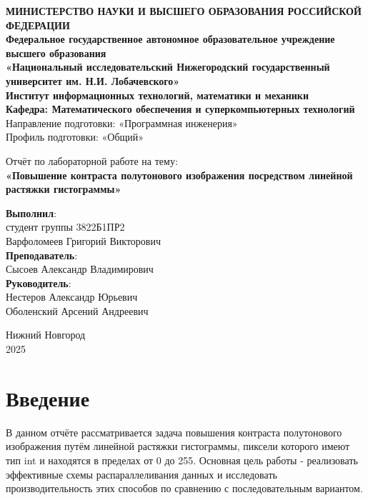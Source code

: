 \documentclass[a4paper,12pt]{article}
\begin{document}
\begin{titlepage}
\begin{center}
\textbf{МИНИСТЕРСТВО НАУКИ И ВЫСШЕГО ОБРАЗОВАНИЯ РОССИЙСКОЙ ФЕДЕРАЦИИ} \\
\textbf{Федеральное государственное автономное образовательное учреждение высшего образования} \\
\textbf{«Национальный исследовательский Нижегородский государственный университет им. Н.И. Лобачевского»} \\[1cm]
\textbf{Институт информационных технологий, математики и механики }\\[0.5cm]
\textbf{Кафедра: Математического обеспечения и суперкомпьютерных технологий}\\[0.5cm]
Направление подготовки: «Программная инженерия»\\
Профиль подготовки: «Общий»\\

\vfill

Отчёт по лабораторной работе на тему:\\
{\Large
\textbf{«Повышение контраста полутонового изображения посредством линейной растяжки гистограммы»} \\
}
\vfill
\begin{flushright}
\textbf{Выполнил}:\\
студент группы 3822Б1ПР2 \\
Варфоломеев Григорий Викторович\\
\vspace{1cm}
\textbf{Преподаватель}: \\
Сысоев Александр Владимирович \\
\textbf{Руководитель}: \\
Нестеров Александр Юрьевич\\
Оболенский Арсений Андреевич\\
\end{flushright}
\vfill
Нижний Новгород \\
2025
\end{center}
\end{titlepage}



\tableofcontents
\newpage


\section{Введение}
В данном отчёте рассматривается задача повышения контраста полутонового изображения путём линейной растяжки гистограммы, пиксели которого имеют тип int и находятся в пределах от 0 до 255. Основная цель работы - реализовать эффективные схемы распараллеливания данных и исследовать производительность этих способов по сравнению с последовательным вариантом.
\newpage
\end{document}

